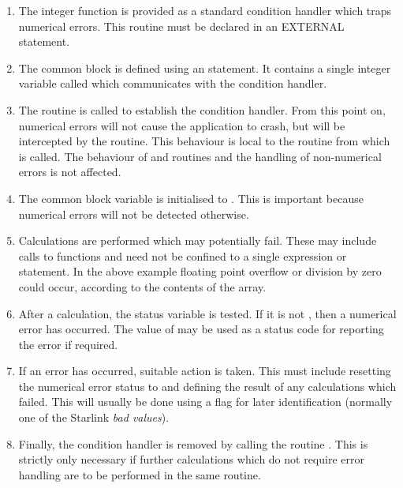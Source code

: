 \begin{enumerate}

\item The integer function  is provided as a standard
condition handler which traps numerical errors.
This routine must be declared in an EXTERNAL statement.

\item The common block  is defined using an 
statement.
It contains a single integer variable called  which
communicates with the condition handler.

\item The   routine  is called to
establish the condition handler.
From this point on, numerical errors will not cause the application to
crash, but will be intercepted by the  routine.
This behaviour is local to the routine from which  is
called.
The behaviour of  and  routines and the handling of
non-numerical errors is not affected.

\item The common block variable  is initialised to
.
This is important because numerical errors will not be detected otherwise.

\item Calculations are performed which may potentially fail.  These may
include calls to  functions and need not be confined to a single
expression or statement.
In the above example floating point overflow or division by zero could
occur, according to the contents of the  array.

\item  After a calculation, the status variable  is tested.
If it is not , then a numerical error has occurred.
The value of  may be used as a status code for reporting
the error if required.

\item  If an error has occurred, suitable action is taken.
This must include resetting the numerical error status  to
 and defining the result of any calculations which failed.
This will usually be done using a flag for later identification (normally
one of the Starlink {\em bad values}).

\item Finally, the condition handler is removed by calling the 
routine .  This is strictly only necessary if further
calculations which do not require error handling are to be performed in the
same routine.

\end{enumerate}


